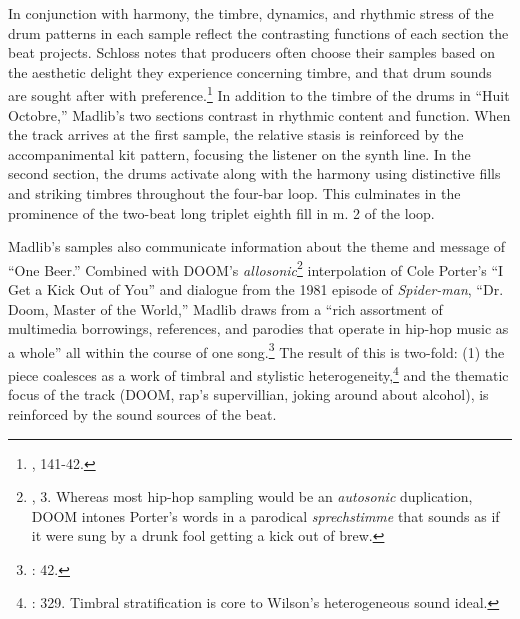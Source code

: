 In conjunction with harmony, the timbre, dynamics, and rhythmic stress of the drum patterns in each sample reflect the contrasting functions of each section the beat projects. Schloss notes that producers often choose their samples based on the aesthetic delight they experience concerning timbre, and that drum sounds are sought after with preference.\footnote{\cite{josephgschlossMakingBeatsArt2004}, 141-42.} In addition to the timbre of the drums in ``Huit Octobre,'' Madlib's two sections contrast in rhythmic content and function. When the track arrives at the first sample, the relative stasis is reinforced by the accompanimental kit pattern, focusing the listener on the synth line. In the second section, the drums activate along with the harmony using distinctive fills and striking timbres throughout the four-bar loop. This culminates in the prominence of the two-beat long triplet eighth fill in m. 2 of the loop.

Madlib's samples also communicate information about the theme and message of ``One Beer.'' Combined with DOOM's \emph{allosonic}\footnote{\cite{justinawilliamsRhyminStealinMusical2013}, 3. Whereas most hip-hop sampling would be an \emph{autosonic} duplication, DOOM intones Porter's words in a parodical \textit{sprechstimme} that sounds as if it were sung by a drunk fool getting a kick out of brew.} interpolation of Cole Porter's ``I Get a Kick Out of You'' and dialogue from the 1981 episode of \textit{Spider-man}, ``Dr. Doom, Master of the World,'' Madlib draws from a ``rich assortment of multimedia borrowings, references, and parodies that operate in hip-hop music as a whole'' all within the course of one song.\footnote{\cite{joannademersSampling1970sHipHop2003}: 42.} The result of this is two-fold: (1) the piece coalesces as a work of timbral and stylistic heterogeneity,\footnote{\cite{ollywilsonHeterogeneousSoundIdeal1992}: 329. Timbral stratification is core to Wilson's heterogeneous sound ideal.} and the thematic focus of the track (DOOM, rap's supervillian, joking around about alcohol), is reinforced by the sound sources of the beat.

